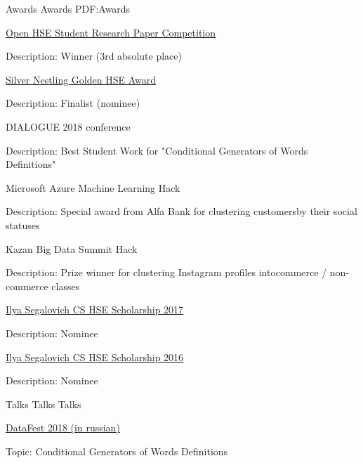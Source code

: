 \documentclass[letterpaper,MMMyyyy,nonstopmode]{simpleresumecv}
\begin{document}
\begin{Body}

\Section
{Awards}
{Awards}
{PDF:Awards}

\BulletItem
\href{https://nirs.hse.ru/nirs/}{Open HSE Student Research Paper Competition}
\begin{Detail}
\Item
Description: Winner (3rd absolute place)
\end{Detail}

\BulletItem
\href{https://www.hse.ru/gold/cm/silver/2018/gadetsky}{Silver Nestling Golden HSE Award}
\begin{Detail}
\Item
Description: Finalist (nominee)
\end{Detail}

\BulletItem
DIALOGUE 2018 conference
\begin{Detail}
\Item
Description: Best Student Work for "Conditional Generators of Words Definitions"
\end{Detail}

\BulletItem
Microsoft Azure Machine Learning Hack
\begin{Detail}
\Item
Description: Special award from Alfa Bank for clustering customersby their social statuses
\end{Detail}

\Gap

\BulletItem
Kazan Big Data Summit Hack
\begin{Detail}
\Item
Description: Prize winner for clustering Instagram profiles intocommerce / non-commerce classes
\end{Detail}

\BulletItem
\href{https://yandex.com/scholarships/students}{Ilya Segalovich CS HSE Scholarship 2017}
\begin{Detail}
\Item
Description: Nominee
\end{Detail}

\BulletItem
\href{https://yandex.com/scholarships/students}{Ilya Segalovich CS HSE Scholarship 2016}
\begin{Detail}
\Item
Description: Nominee
\end{Detail}


\Section
{Talks}
{Talks}
{Talks}

\Item
\href{http://datafest.ru}{DataFest 2018 (in russian)}
\begin{Detail}
\Item
Topic: Conditional Generators of Words Definitions
\end{Detail}


\end{Body}
\end{document}
